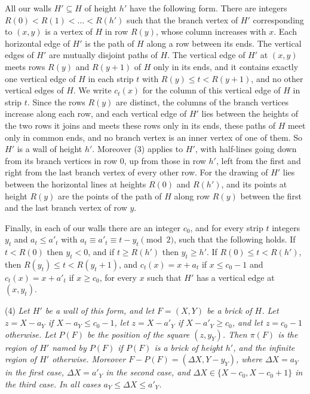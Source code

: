 {All our walls $H' \subseteq H$ of height $h'$ have the following form. There are integers $R(0) < R(1) < \dots < R(h')$ such that the branch vertex of $H'$ corresponding to $(x, y)$ is a vertex of $H$ in row $R(y)$, whose column increases with $x$. Each horizontal edge of $H'$ is the path of $H$ along a row between its ends. The vertical edges of $H'$ are mutually disjoint paths of $H$. The vertical edge of $H'$ at $(x, y)$ meets rows $R(y)$ and $R(y + 1)$ of $H$ only in its ends, and it contains exactly one vertical edge of $H$ in each strip $t$ with $R(y) \le t < R(y + 1)$, and no other vertical edges of $H$. We write $c_t(x)$ for the column of this vertical edge of $H$ in strip $t$. Since the rows $R(y)$ are distinct, the columns of the branch vertices increase along each row, and each vertical edge of $H'$ lies between the heights of the two rows it joins and meets these rows only in its ends, these paths of $H$ meet only in common ends, and no branch vertex is an inner vertex of one of them. So $H'$ is a wall of height $h'$. Moreover (3) applies to $H'$, with half-lines going down from its branch vertices in row $0$, up from those in row $h'$, left from the first and right from the last branch vertex of every other row. For the drawing of $H'$ lies between the horizontal lines at heights $R(0)$ and $R(h')$, and its points at height $R(y)$ are the points of the path of $H$ along row $R(y)$ between the first and the last branch vertex of row $y$.

Finally, in each of our walls there are an integer $c_0$, and for every strip $t$ integers $y_t$ and $a_t \le a'_t$ with $a_t \equiv a'_t \equiv t - y_t \pmod 2$, such that the following holds. If $t < R(0)$ then $y_t < 0$, and if $t \ge R(h')$ then $y_t \ge h'$. If $R(0) \le t < R(h')$, then $R(y_t) \le t < R(y_t + 1)$, and $c_t(x) = x + a_t$ if $x \le c_0 - 1$ and $c_t(x) = x + a'_t$ if $x \ge c_0$, for every $x$ such that $H'$ has a vertical edge at $(x, y_t)$.

\hspace*{12pt}(4) \textit{Let $H'$ be a wall of this form, and let $F = (X, Y)$ be a brick of $H$. Let $z = X - a_Y$ if $X - a_Y \le c_0 - 1$, let $z = X - a'_Y$ if $X - a'_Y \ge c_0$, and let $z = c_0 - 1$ otherwise. Let $P(F)$ be the position of the square $(z, y_Y)$. Then $\pi(F)$ is the region of $H'$ named by $P(F)$ if $P(F)$ is a brick of height $h'$, and the infinite region of $H'$ otherwise. Moreover $F - P(F) = (\Delta X, Y - y_Y)$, where $\Delta X = a_Y$ in the first case, $\Delta X = a'_Y$ in the second case, and $\Delta X \in \{X - c_0, X - c_0 + 1\}$ in the third case. In all cases $a_Y \le \Delta X \le a'_Y$.}

}
